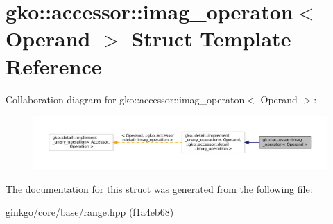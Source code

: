 \hypertarget{structgko_1_1accessor_1_1imag__operaton}{}\section{gko\+:\+:accessor\+:\+:imag\+\_\+operaton$<$ Operand $>$ Struct Template Reference}
\label{structgko_1_1accessor_1_1imag__operaton}


Collaboration diagram for gko\+:\+:accessor\+:\+:imag\+\_\+operaton$<$ Operand $>$\+:
\nopagebreak
\begin{figure}[H]
\begin{center}
\leavevmode
\includegraphics[width=350pt]{structgko_1_1accessor_1_1imag__operaton__coll__graph}
\end{center}
\end{figure}


The documentation for this struct was generated from the following file\+:\begin{DoxyCompactItemize}
\item 
ginkgo/core/base/range.\+hpp (f1a4eb68)\end{DoxyCompactItemize}

